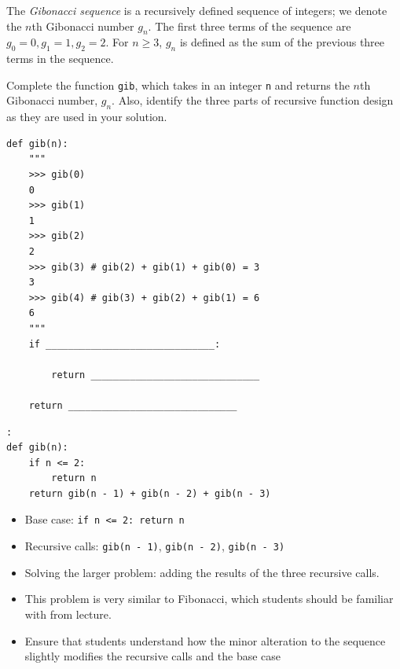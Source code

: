 \begin{blocksection}
\question The \textit{Gibonacci sequence} is a recursively defined sequence of integers; we denote the $n$th Gibonacci number $g_n$. The first three terms of the sequence are $g_0 = 0, g_1 = 1, g_2 = 2$. For $n \geq 3$, $g_n$ is defined as the sum of the previous three terms in the sequence. 

Complete the function \lstinline{gib}, which takes in an integer \lstinline{n} and returns the $n$th Gibonacci number, $g_n$. Also, identify the three parts of recursive function design as they are used in your solution. 

\begin{lstlisting}
def gib(n):
    """
    >>> gib(0)
    0
    >>> gib(1)
    1
    >>> gib(2)
    2
    >>> gib(3) # gib(2) + gib(1) + gib(0) = 3
    3
    >>> gib(4) # gib(3) + gib(2) + gib(1) = 6
    6
    """
    if ______________________________:

        return ______________________________
        
    return ______________________________
\end{lstlisting}

\begin{solution}[0in]
\begin{lstlisting}:
def gib(n):
    if n <= 2:
        return n
    return gib(n - 1) + gib(n - 2) + gib(n - 3)
\end{lstlisting}

\begin{itemize}
    \item Base case: \lstinline{if n <= 2: return n}
    \item Recursive calls: \lstinline{gib(n - 1)}, \lstinline{gib(n - 2)}, \lstinline{gib(n - 3)}
    \item Solving the larger problem: adding the results of the three recursive calls. 
\end{itemize}
\end{solution}

\begin{questionmeta}
    \begin{itemize}
        \item This problem is very similar to Fibonacci, which students should be familiar with from lecture. 
        \item Ensure that students understand how the minor alteration to the sequence slightly modifies the 
          recursive calls and the base case
    \end{itemize}
\end{questionmeta}

\end{blocksection}

